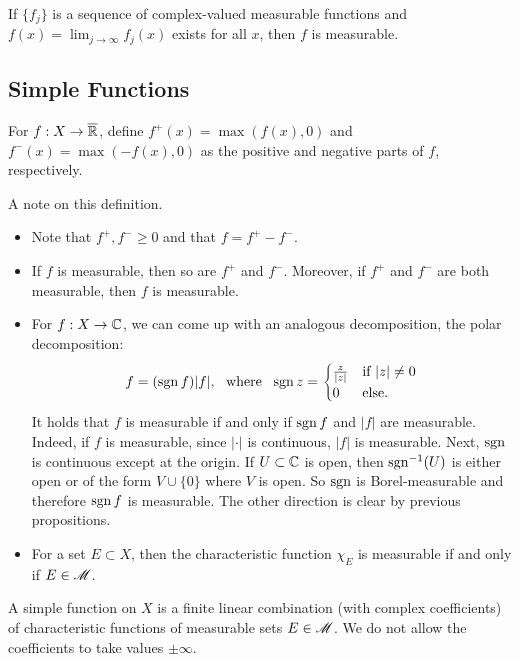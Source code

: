 \documentclass[12pt]{article} %
\begin{document}
\begin{corollary}
    If $\{f_j\}$ is a sequence of complex-valued measurable functions and $f(x) = \lim_{j \to \infty} f_j(x)$ exists for all $x$, then $f$ is measurable.
\end{corollary}

\subsection{Simple Functions}

\begin{definition}
    For $f : X \to \overline{\mathbb{R}}$, define $f^+(x) = \max(f(x), 0)$ and $f^-(x) = \max(-f(x), 0)$ as the positive and negative parts of $f$, respectively.
\end{definition}

\begin{remark}
    A note on this definition.
    \begin{itemize}
        \item Note that $f^+, f^- \geq 0$ and that $f = f^+ - f^-$.
        \item If $f$ is measurable, then so are $f^+$ and $f^-$. Moreover, if $f^+$ and $f^-$ are both measurable, then $f$ is measurable.
        \item For $f : X \to \mathbb{C}$, we can come up with an analogous decomposition, the polar decomposition: \[f = (\operatorname{sgn} f) |f|, \ \ \text{where} \ \ \operatorname{sgn} z = \begin{cases}
            \frac{z}{|z|} &\text{if} \ |z| \neq 0\\
            0 &\text{else}.
        \end{cases}\] It holds that $f$ is measurable if and only if $\operatorname{sgn} f$ and $|f|$ are measurable. Indeed, if $f$ is measurable, since $|\cdot|$ is continuous, $|f|$ is measurable. Next, $\operatorname{sgn}$ is continuous except at the origin. If $U \subset \mathbb{C}$ is open, then $\operatorname{sgn}^{-1}(U)$ is either open or of the form $V \cup \{0\}$ where $V$ is open. So $\operatorname{sgn}$ is Borel-measurable and therefore $\operatorname{sgn} f$ is measurable. The other direction is clear by previous propositions.
        \item For a set $E \subset X$, then the characteristic function $\chi_E$ is measurable if and only if $E \in \mathscr{M}$.
    \end{itemize}
\end{remark}

\begin{definition}
    A simple function on $X$ is a finite linear combination (with complex coefficients) of characteristic functions of measurable sets $E \in \mathscr{M}$. We do not allow the coefficients to take values $\pm \infty$.
\end{definition}
\end{document}
